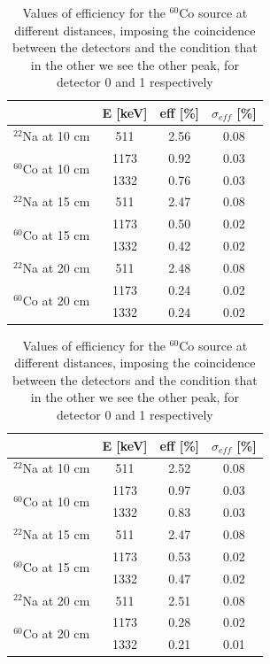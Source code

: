 \begin{table}[h]
    \begin{subtable}
        \centering
        \begin{tabular}{|c|c|c|c|}
        \hline
        & E [keV]  & eff [\%] &$\sigma_{eff}$ [\%]  \\
        \hline
        $^{22}$Na at 10 cm & 511 & 2.56 & 0.08 \\
        \hline
        \multirow{2}{*}{$^{60}$Co at 10 cm}&1173 &0.92 & 0.03 \\ 
        &1332 &0.76 & 0.03 \\
        \hline
        $^{22}$Na at 15 cm & 511 & 2.47 & 0.08 \\
        \hline
        \multirow{2}{*}{$^{60}$Co at 15 cm}&1173 &0.50 & 0.02 \\ 
        &1332 &0.42 & 0.02 \\
        \hline
        $^{22}$Na at 20 cm & 511 & 2.48 & 0.08 \\
        \hline
        \multirow{2}{*}{$^{60}$Co at 20 cm}&1173 &0.24 & 0.02 \\
        &1332 &0.24& 0.02 \\
        \hline
        \end{tabular}
    \end{subtable}
    \qquad
    \qquad
    \qquad
    \begin{subtable}
        \centering
        \begin{tabular}{|c|c|c|c|}
        \hline
        & E [keV]  & eff [\%] &$\sigma_{eff}$ [\%]  \\
        \hline
        $^{22}$Na at 10 cm & 511 & 2.52 & 0.08 \\
        \hline
        \multirow{2}{*}{$^{60}$Co at 10 cm}&1173 &0.97 &0.03 \\ 
        &1332 &0.83 & 0.03 \\
        \hline
        $^{22}$Na at 15 cm & 511 & 2.47 & 0.08 \\
        \hline
        \multirow{2}{*}{$^{60}$Co at 15 cm}&1173 &0.53 & 0.02 \\ 
        &1332 &0.47 & 0.02 \\
        \hline
        $^{22}$Na at 20 cm & 511 & 2.51 & 0.08 \\
        \hline
        \multirow{2}{*}{$^{60}$Co at 20 cm}&1173 &0.28 & 0.02 \\
        &1332 &0.21 & 0.01 \\
        \hline
        \end{tabular}
     \end{subtable}
     \caption{Values of efficiency for the $^{60}$Co source at different distances, imposing the coincidence between the detectors and the condition that in the other we see the other peak, for detector 0 and 1 respectively}
     \label{tab:eff_coin_en}
\end{table}

